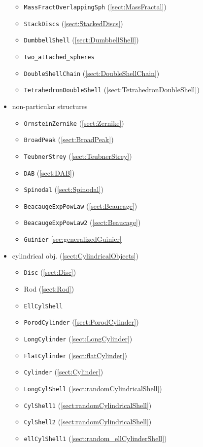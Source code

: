 \begin{itemize}
\begin{itemize}
\item \texttt{MassFractOverlappingSph} (\ref{sect:MassFractal})
\item \texttt{StackDiscs} (\ref{sect:StackedDiscs})
\item \texttt{DumbbellShell} (\ref{sect:DumbbellShell})
\item \texttt{two\_attached\_spheres}
\item \texttt{DoubleShellChain} (\ref{sect:DoubleShellChain})
\item \texttt{TetrahedronDoubleShell} (\ref{sect:TetrahedronDoubleShell})
\end{itemize}
\item non-particular structures
\begin{itemize}
\item \texttt{OrnsteinZernike} (\ref{sect:Zernike})
\item \texttt{BroadPeak} (\ref{sect:BroadPeak})
\item \texttt{TeubnerStrey} (\ref{sect:TeubnerStrey})
\item \texttt{DAB} (\ref{sect:DAB})
\item \texttt{Spinodal} (\ref{sect:Spinodal})
\item \texttt{BeacaugeExpPowLaw} (\ref{sect:Beaucage})
\item \texttt{BeacaugeExpPowLaw2} (\ref{sect:Beaucage})
\item \texttt{Guinier} \ref{sec:generalizedGuinier}
\end{itemize}
\item cylindrical obj. (\ref{sect:CylindricalObjects})
\begin{itemize}
\item \texttt{Disc} (\ref{sect:Disc})
\item Rod (\ref{sect:Rod})
\item \texttt{EllCylShell}
\item \texttt{PorodCylinder} (\ref{sect:PorodCylinder})
\item \texttt{LongCylinder} (\ref{sect:LongCylinder})
\item \texttt{FlatCylinder} (\ref{sect:flatCylinder})
\item \texttt{Cylinder} (\ref{sect:Cylinder})
\item \texttt{LongCylShell} (\ref{sect:randomCylindricalShell})
\item \texttt{CylShell1} (\ref{sect:randomCylindricalShell})
\item \texttt{CylShell2} (\ref{sect:randomCylindricalShell})
\item \texttt{ellCylShell1} (\ref{sect:random_ellCylinderShell})

\end{itemize}
\end{itemize}

